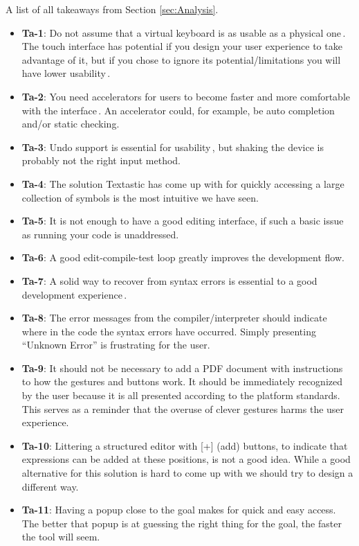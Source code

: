 A list of all takeaways from Section \ref{sec:Analysis}.
\begin{itemize}
	\item \textbf{Ta-1}: Do not assume that a virtual keyboard is as usable as a physical one\,\cite{nielsen2013mobile}. The touch interface has potential if you design your user experience to take advantage of it, but if you chose to ignore its potential/limitations you will have lower usability\,\cite{nielsen1990heuristic}.
	\item \textbf{Ta-2}: You need accelerators for users to become faster and more comfortable with the interface\,\cite{nielsen1990heuristic}. An accelerator could, for example, be auto completion and/or static checking.
	\item \textbf{Ta-3}: Undo support is essential for usability\,\cite{nielsen1990heuristic}, but shaking the device is probably not the right input method.
	\item \textbf{Ta-4}: The solution Textastic has come up with for quickly accessing a large collection of symbols is the most intuitive we have seen.
	\item \textbf{Ta-5}: It is not enough to have a good editing interface, if such a basic issue as running your code is unaddressed.
		\item \textbf{Ta-6}: A good edit-compile-test loop greatly improves the development flow.
	\item \textbf{Ta-7}: A solid way to recover from syntax errors is essential to a good development experience\,\cite{nielsen1990heuristic}.
	\item \textbf{Ta-8}: The error messages from the compiler/interpreter should indicate where in the code the syntax errors have occurred. Simply presenting ``Unknown Error'' is frustrating for the user.
	\item \textbf{Ta-9}: It should not be necessary to add a PDF document with instructions to how the gestures and buttons work. It should be immediately recognized by the user because it is all presented according to the platform standards. This serves as a reminder that the overuse of clever gestures harms the user experience.
	\item \textbf{Ta-10}: Littering a structured editor with [+] (add) buttons, to indicate that expressions can be added at these positions, is not a good idea. While a good alternative for this solution is hard to come up with we should try to design a different way.
	\item \textbf{Ta-11}: Having a popup close to the goal makes for quick and easy access. The better that popup is at guessing the right thing for the goal, the faster the tool will seem.

\end{itemize}

